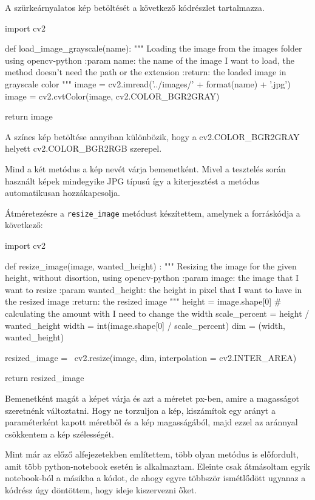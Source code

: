 A szürkeárnyalatos kép betöltését a következő kódrészlet tartalmazza.
\begin{python}
import cv2

def load_image_grayscale(name):
    """
    Loading the image from the images folder using opencv-python
    :param name: the name of the image I want to load,
        the method doesn't need the path or the extension
    :return: the loaded image in grayscale color
    """
    image = cv2.imread('../images/' + format(name) + '.jpg')
    image = cv2.cvtColor(image, cv2.COLOR_BGR2GRAY)

    return image
\end{python}
A színes kép betöltése annyiban különbözik, hogy a cv2.COLOR\_BGR2GRAY helyett cv2.COLOR\_BGR2RGB szerepel.

Mind a két metódus a kép nevét várja bemenetként. Mivel a tesztelés során használt képek mindegyike JPG típusú így a kiterjesztést a metódus automatikusan hozzákapcsolja.


Átméretezésre a \texttt{resize\_image} metódust készítettem, amelynek a forráskódja a következő:
\begin{python}
import cv2

def resize_image(image, wanted_height) :
    """
    Resizing the image for the given height,
    without disortion, using opencv-python
    :param image: the image that I want to resize
    :param wanted_height: the height in pixel that
        I want to have in the resized image
    :return: the resized image
    """
    height = image.shape[0]
    # calculating the amount with I need to change the width
    scale_percent = height / wanted_height
    width = int(image.shape[0] / scale_percent)
    dim = (width, wanted_height)

    resized_image = \
        cv2.resize(image, dim, interpolation = cv2.INTER_AREA)

    return resized_image
\end{python}
Bemenetként magát a képet várja és azt a méretet px-ben, amire a magasságot szeretnénk változtatni. Hogy ne torzuljon a kép, kiszámítok egy arányt a paraméterként kapott méretből és a kép magasságából, majd ezzel az aránnyal csökkentem a kép szélességét.


Mint már az előző alfejezetekben említettem, több olyan metódus is előfordult, amit több python-notebook esetén is alkalmaztam. Eleinte csak átmásoltam egyik notebook-ból a másikba a kódot, de ahogy egyre többször ismétlődött ugyanaz a kódrész úgy döntöttem, hogy ideje kiszervezni őket.


